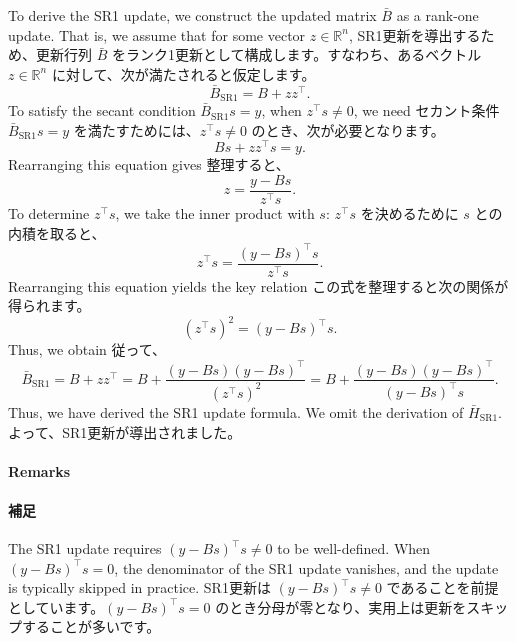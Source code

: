 \documentclass[0_main]{subfiles}
\begin{document}
\ifEn
    To derive the SR1 update, we construct the updated matrix $\bar{B}$ as a rank-one update. That is, we assume that for some vector $z \in \mathbb{R}^n$,
\else
    SR1更新を導出するため、更新行列 $\bar{B}$ をランク1更新として構成します。すなわち、あるベクトル $z \in \mathbb{R}^n$ に対して、次が満たされると仮定します。
\fi
\begin{equation*}
    \bar{B}_{\mathrm{SR1}} = B + z z^\top.
\end{equation*}
\ifEn
    To satisfy the secant condition $\bar{B}_{\mathrm{SR1}} s = y$, when $z^\top s \neq 0$, we need
\else
    セカント条件 $\bar{B}_{\mathrm{SR1}} s = y$ を満たすためには、$z^\top s \neq 0$ のとき、次が必要となります。
\fi
\begin{equation*}
    B s + z z^\top s = y.
\end{equation*}
\ifEn
    Rearranging this equation gives
\else
    整理すると、
\fi
\begin{equation*}
    z = \frac{y - B s}{z^\top s}.
\end{equation*}
\ifEn
    To determine $z^\top s$, we take the inner product with $s$:
\else
    $z^\top s$ を決めるために $s$ との内積を取ると、
\fi
\begin{equation*}
    z^\top s = \frac{(y - B s)^\top s}{z^\top s}.
\end{equation*}
\ifEn
    Rearranging this equation yields the key relation
\else
    この式を整理すると次の関係が得られます。
\fi
\begin{equation*}
    (z^\top s)^2 = (y - B s)^\top s.
\end{equation*}
\ifEn
    Thus, we obtain
\else
    従って、
\fi
\begin{equation*}
    \bar{B}_{\mathrm{SR1}}
    = B + z z^\top
    = B + \frac{(y - B s)(y - B s)^\top}{(z^\top s)^2}
    = B + \frac{(y - B s)(y - B s)^\top}{(y - B s)^\top s}.
\end{equation*}
\ifEn
    Thus, we have derived the SR1 update formula.
    We omit the derivation of $\bar{H}_{\mathrm{SR1}}$.
\else
    よって、SR1更新が導出されました。
\fi

\ifEn
    \paragraph{Remarks}
\else
    \paragraph{補足}
\fi

\ifEn
    The SR1 update requires $(y - Bs)^\top s \neq 0$ to be well-defined. When $(y - Bs)^\top s = 0$, the denominator of the SR1 update vanishes, and the update is typically skipped in practice.
\else
    SR1更新は $(y - Bs)^\top s \neq 0$ であることを前提としています。$(y - Bs)^\top s = 0$ のとき分母が零となり、実用上は更新をスキップすることが多いです。
\fi
\end{document}
